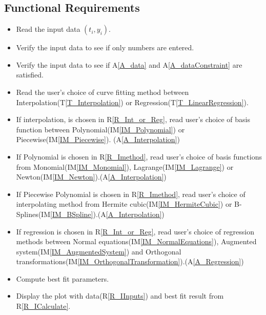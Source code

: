 \documentclass[12pt]{article}
\newcommand{\tref}[1]{T\ref{#1}}
\newcommand{\aref}[1]{A\ref{#1}}
\newcommand{\iref}[1]{IM\ref{#1}}
\newcounter{reqnum} %
\newcommand{\rref}[1]{R\ref{#1}}
\begin{document}
\subsection{Functional Requirements}

\begin{itemize}
\item[R\refstepcounter{reqnum}\thereqnum \label{R_IInputs}:] Read the input data $(t_i,y_i)$.

\item[R\refstepcounter{reqnum}\thereqnum \label{R_IverifyIPType}:]Verify the input data to see if only numbers are entered.

\item[R\refstepcounter{reqnum}\thereqnum \label{R_IverifyIPData}:]Verify the input data to see if \aref{A_data} and \aref{A_dataConstraint} are satisfied.

\item[R\refstepcounter{reqnum}\thereqnum \label{R_Int_or_Reg}:]Read the user's choice of curve fitting method between Interpolation(\tref{T_Interpolation}) or Regression(\tref{T_LinearRegression}).

\item[R\refstepcounter{reqnum}\thereqnum \label{R_Imethod}:]If interpolation, is chosen in \rref{R_Int_or_Reg}, read user's choice of basis function between Polynomial(\iref{IM_Polynomial}) or Piecewise(\iref{IM_Piecewise}). (\aref{A_Interpolation})

\item[R\refstepcounter{reqnum}\thereqnum \label{R_Polynomialmethod}:]If Polynomial is chosen in \rref{R_Imethod}, read user's choice of basis functions from Monomial(\iref{IM_Monomial}), Lagrange(\iref{IM_Lagrange}) or Newton(\iref{IM_Newton}).(\aref{A_Interpolation})

\item[R\refstepcounter{reqnum}\thereqnum \label{R_Piecewisemethod}:]If Piecewise Polynomial is chosen in \rref{R_Imethod}, read user's choice of interpolating method from Hermite cubic(\iref{IM_HermiteCubic}) or B-Splines(\iref{IM_BSpline}).(\aref{A_Interpolation})

\item[R\refstepcounter{reqnum}\thereqnum \label{R_Rmethod}:]If regression is chosen in \rref{R_Int_or_Reg}, read user's choice of regression methods between Normal equations(\iref{IM_NormalEquations}), Augmented system(\iref{IM_AugmentedSystem}) and Orthogonal transformations(\iref{IM_OrthogonalTransformation}).(\aref{A_Regression})

\item[R\refstepcounter{reqnum}\thereqnum \label{R_ICalculate}:] Compute best fit parameters.

\item[R\refstepcounter{reqnum}\thereqnum \label{R_IOutput}:] Display the plot with data(\rref{R_IInputs}) and best fit result from \rref{R_ICalculate}.

\end{itemize}
\end{document}
